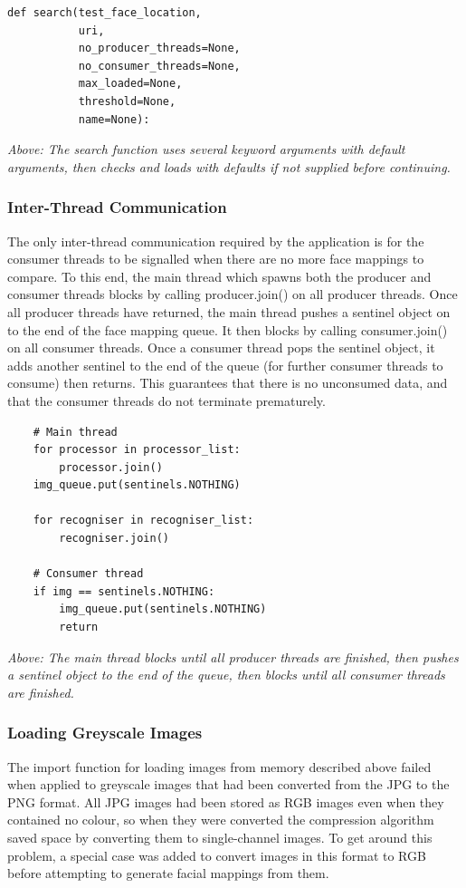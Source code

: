 \documentclass[12pt]{article}
\begin{document}
\begin{lstlisting}
def search(test_face_location,
           uri,
           no_producer_threads=None,
           no_consumer_threads=None,
           max_loaded=None,
           threshold=None,
           name=None):
\end{lstlisting}
\textit{Above: The search function uses several keyword arguments with default arguments, then checks and loads with defaults if not supplied before continuing.}

\subsubsection{Inter-Thread Communication}
The only inter-thread communication required by the application is for the consumer threads to be signalled when there are no more face mappings to compare. To this end, the main thread which spawns both the producer and consumer threads blocks by calling producer.join() on all producer threads. Once all producer threads have returned, the main thread pushes a sentinel object on to the end of the face mapping queue. It then blocks by calling consumer.join() on all consumer threads. Once a consumer thread pops the sentinel object, it adds another sentinel to the end of the queue (for further consumer threads to consume) then returns. This guarantees that there is no unconsumed data, and that the consumer threads do not terminate prematurely.

\begin{lstlisting}
	# Main thread
    for processor in processor_list:
        processor.join()
    img_queue.put(sentinels.NOTHING)

    for recogniser in recogniser_list:
        recogniser.join()
        
    # Consumer thread
    if img == sentinels.NOTHING:
        img_queue.put(sentinels.NOTHING)
        return
\end{lstlisting}
\textit{Above: The main thread blocks until all producer threads are finished, then pushes a sentinel object to the end of the queue, then blocks until all consumer threads are finished.}

\subsubsection{Loading Greyscale Images}
The import function for loading images from memory described above failed when applied to greyscale images that had been converted from the JPG to the PNG format. All JPG images had been stored as RGB images even when they contained no colour, so when they were converted the compression algorithm saved space by converting them to single-channel images. To get around this problem, a special case was added to convert images in this format to RGB before attempting to generate facial mappings from them.
\end{document}
